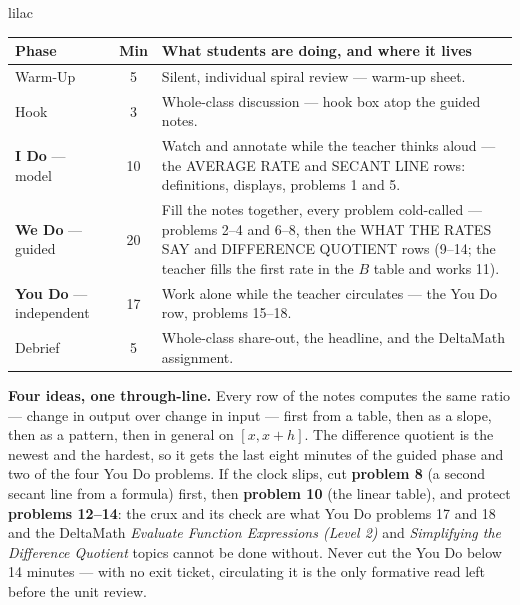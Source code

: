 \documentclass[10pt]{article}
\begin{document}
\boxguard[22]
\begin{skillbox}{lilac}
\small
\renewcommand{\arraystretch}{1.25}
\begin{tabularx}{\linewidth}{@{} l c X @{}}
\textbf{Phase} & \textbf{Min} & \textbf{What students are doing, and where it lives} \\
\midrule
Warm-Up                       & 5  & Silent, individual spiral review --- warm-up sheet. \\
Hook                          & 3  & Whole-class discussion --- hook box atop the guided notes. \\
\textbf{I Do} --- model       & 10 & Watch and annotate while the teacher thinks aloud --- the AVERAGE RATE and SECANT LINE rows: definitions, displays, problems 1 and 5. \\
\textbf{We Do} --- guided     & 20 & Fill the notes together, every problem cold-called --- problems 2--4 and 6--8, then the WHAT THE RATES SAY and DIFFERENCE QUOTIENT rows (9--14; the teacher fills the first rate in the $B$ table and works 11). \\
\textbf{You Do} --- independent & 17 & Work alone while the teacher circulates --- the You Do row, problems 15--18. \\
Debrief                       & 5  & Whole-class share-out, the headline, and the DeltaMath assignment. \\
\end{tabularx}

\smallskip
\textbf{Four ideas, one through-line.} Every row of the notes computes the same ratio ---
change in output over change in input --- first from a table, then as a slope, then as a
pattern, then in general on $[x, x + h]$. The difference quotient is the newest and the
hardest, so it gets the last eight minutes of the guided phase and two of the four You Do
problems. If the clock slips, cut \textbf{problem 8} (a second secant line from a formula)
first, then \textbf{problem 10} (the linear table), and protect \textbf{problems 12--14}:
the crux and its check are what You Do problems 17 and 18 and the DeltaMath
\textit{Evaluate Function Expressions (Level 2)} and \textit{Simplifying the Difference
Quotient} topics cannot be done without.
Never cut the You Do below 14 minutes --- with no exit ticket, circulating it is the only
formative read left before the unit review.
\end{skillbox}
\end{document}

